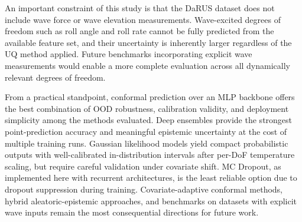 \documentclass[a4paper,fleqn]{cas-sc}
\begin{document}
An important constraint of this study is that the DaRUS dataset does not include wave force or wave elevation measurements. Wave-excited degrees of freedom such as roll angle and roll rate cannot be fully predicted from the available feature set, and their uncertainty is inherently larger regardless of the UQ method applied. Future benchmarks incorporating explicit wave measurements would enable a more complete evaluation across all dynamically relevant degrees of freedom.

From a practical standpoint, conformal prediction over an MLP backbone offers the best combination of OOD robustness, calibration validity, and deployment simplicity among the methods evaluated. Deep ensembles provide the strongest point-prediction accuracy and meaningful epistemic uncertainty at the cost of multiple training runs. Gaussian likelihood models yield compact probabilistic outputs with well-calibrated in-distribution intervals after per-DoF temperature scaling, but require careful validation under covariate shift. MC Dropout, as implemented here with recurrent architectures, is the least reliable option due to dropout suppression during training. Covariate-adaptive conformal methods, hybrid aleatoric-epistemic approaches, and benchmarks on datasets with explicit wave inputs remain the most consequential directions for future work.



% 

% 

\end{document}
